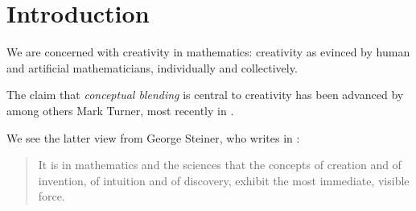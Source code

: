 \section{Introduction}
\label{sec:intro}

We are concerned with creativity in mathematics: creativity
as evinced by human and artificial mathematicians,
individually and collectively.

The claim that \emph{conceptual blending} is central to creativity
has been advanced by among others Mark Turner, most recently
in \textcite{MTurner14}.

We see the latter view from George Steiner, who writes in 
\citet[p~145]{Ste01}:
\begin{quote}
  It is in mathematics and the sciences that the concepts of
creation and of invention, of intuition and of discovery,
exhibit the most immediate, visible force.
\end{quote}

\clearpage

